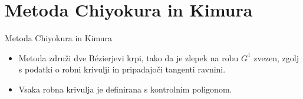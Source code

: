 \documentclass[a4paper,8pt]{beamer}
\begin{document}
\section{Metoda Chiyokura in Kimura}
\begin{frame}{Metoda Chiyokura in Kimura}
	\begin{itemize}
		\item <1->Metoda združi dve Bézierjevi krpi, tako da je zlepek na robu $G^1$ zvezen, zgolj s podatki
		o robni krivulji in pripadajoči tangenti ravnini.
		\item <1-> Vsaka robna krivulja je definirana s kontrolnim poligonom.
	\end{itemize}


	
\end{frame}
\end{document}
